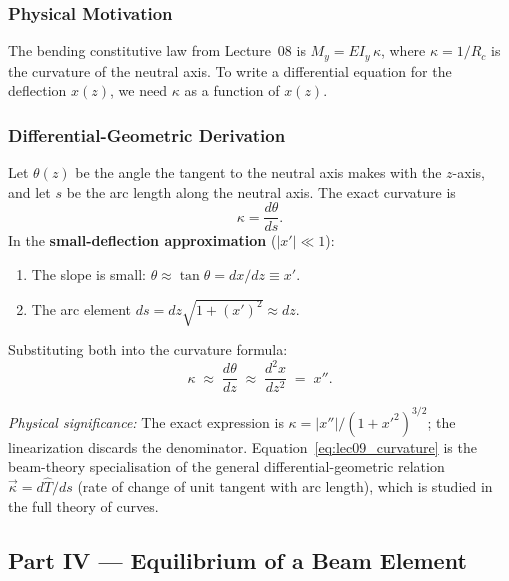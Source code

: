 \documentclass[../main.tex]{subfiles}
\begin{document}
\subsubsection*{Physical Motivation}
The bending constitutive law from Lecture~08 is $M_y = EI_y\,\kappa$, where $\kappa=1/R_c$ is the curvature of the neutral axis. To write a differential equation for the deflection $x(z)$, we need $\kappa$ as a function of $x(z)$.

\subsubsection*{Differential-Geometric Derivation}
Let $\theta(z)$ be the angle the tangent to the neutral axis makes with the $z$-axis, and let $s$ be the arc length along the neutral axis. The exact curvature is
\[
  \kappa = \frac{d\theta}{ds}.
\]
In the \textbf{small-deflection approximation} ($|x'|\ll 1$):
\begin{enumerate}
  \item The slope is small: $\theta \approx \tan\theta = dx/dz \equiv x'$.
  \item The arc element $ds = dz\sqrt{1+(x')^2} \approx dz$.
\end{enumerate}
Substituting both into the curvature formula:
\begin{equation}
  \boxed{\kappa \;\approx\; \frac{d\theta}{dz} \;\approx\; \frac{d^2x}{dz^2} \;=\; x''.}
  \label{eq:lec09_curvature}
\end{equation}

\textit{Physical significance:} The exact expression is $\kappa=|x''|/(1+x'^2)^{3/2}$; the linearization discards the denominator. Equation~\eqref{eq:lec09_curvature} is the beam-theory specialisation of the general differential-geometric relation $\vec{\kappa}=d\hat{T}/ds$ (rate of change of unit tangent with arc length), which is studied in the full theory of curves.

\subsection*{Part IV — Equilibrium of a Beam Element}
\end{document}
